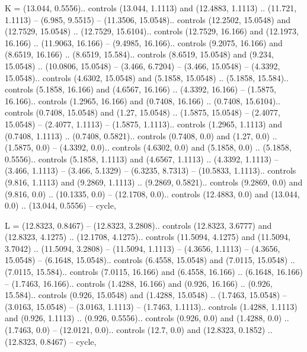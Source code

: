 K = {(13.044, 0.5556).. controls (13.044, 1.1113) and (12.4883, 1.1113) .. (11.721, 1.1113) -- (6.985, 9.5515) -- (11.3506, 15.0548).. controls (12.2502, 15.0548) and (12.7529, 15.0548) .. (12.7529, 15.6104).. controls (12.7529, 16.166) and (12.1973, 16.166) .. (11.9063, 16.166) -- (9.4985, 16.166).. controls (9.2075, 16.166) and (8.6519, 16.166) .. (8.6519, 15.584).. controls (8.6519, 15.0548) and (9.234, 15.0548) .. (10.0806, 15.0548) -- (3.466, 6.7204) -- (3.466, 15.0548) -- (4.3392, 15.0548).. controls (4.6302, 15.0548) and (5.1858, 15.0548) .. (5.1858, 15.584).. controls (5.1858, 16.166) and (4.6567, 16.166) .. (4.3392, 16.166) -- (1.5875, 16.166).. controls (1.2965, 16.166) and (0.7408, 16.166) .. (0.7408, 15.6104).. controls (0.7408, 15.0548) and (1.27, 15.0548) .. (1.5875, 15.0548) -- (2.4077, 15.0548) -- (2.4077, 1.1113) -- (1.5875, 1.1113).. controls (1.2965, 1.1113) and (0.7408, 1.1113) .. (0.7408, 0.5821).. controls (0.7408, 0.0) and (1.27, 0.0) .. (1.5875, 0.0) -- (4.3392, 0.0).. controls (4.6302, 0.0) and (5.1858, 0.0) .. (5.1858, 0.5556).. controls (5.1858, 1.1113) and (4.6567, 1.1113) .. (4.3392, 1.1113) -- (3.466, 1.1113) -- (3.466, 5.1329) -- (6.3235, 8.7313) -- (10.5833, 1.1113).. controls (9.816, 1.1113) and (9.2869, 1.1113) .. (9.2869, 0.5821).. controls (9.2869, 0.0) and (9.816, 0.0) .. (10.1335, 0.0) -- (12.1708, 0.0).. controls (12.4883, 0.0) and (13.044, 0.0) .. (13.044, 0.5556) -- cycle},

L = {(12.8323, 0.8467) -- (12.8323, 3.2808).. controls (12.8323, 3.6777) and (12.8323, 4.1275) .. (12.1708, 4.1275).. controls (11.5094, 4.1275) and (11.5094, 3.7042) .. (11.5094, 3.2808) -- (11.5094, 1.1113) -- (4.3656, 1.1113) -- (4.3656, 15.0548) -- (6.1648, 15.0548).. controls (6.4558, 15.0548) and (7.0115, 15.0548) .. (7.0115, 15.584).. controls (7.0115, 16.166) and (6.4558, 16.166) .. (6.1648, 16.166) -- (1.7463, 16.166).. controls (1.4288, 16.166) and (0.926, 16.166) .. (0.926, 15.584).. controls (0.926, 15.0548) and (1.4288, 15.0548) .. (1.7463, 15.0548) -- (3.0163, 15.0548) -- (3.0163, 1.1113) -- (1.7463, 1.1113).. controls (1.4288, 1.1113) and (0.926, 1.1113) .. (0.926, 0.5556).. controls (0.926, 0.0) and (1.4288, 0.0) .. (1.7463, 0.0) -- (12.0121, 0.0).. controls (12.7, 0.0) and (12.8323, 0.1852) .. (12.8323, 0.8467) -- cycle},


